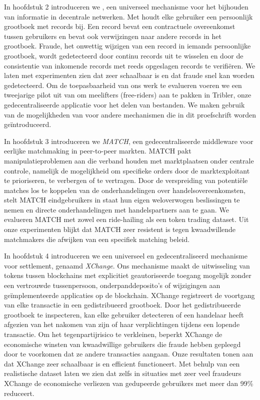{In hoofdstuk 2 introduceren we \emph{\TrustChain{}}, een universeel mechanisme voor het bijhouden van informatie in decentrale netwerken.
Met \TrustChain{} houdt elke gebruiker een persoonlijk grootboek met records bij.
Een record bevat een contractuele overeenkomst tussen gebruikers en bevat ook verwijzingen naar andere records in het grootboek.
Fraude, het onwettig wijzigen van een record in iemands persoonlijke grootboek, wordt gedetecteerd door continu records uit te wisselen en door de consistentie van inkomende records met reeds opgeslagen records te verifiëren.
We laten met experimenten zien dat \TrustChain{} zeer schaalbaar is en dat fraude snel kan worden gedetecteerd.
Om de toepasbaarheid van ons werk te evalueren voeren we een tweejarige pilot uit van \TrustChain{} om meelifters (free-riders) aan te pakken in Tribler, onze gedecentraliseerde applicatie voor het delen van bestanden.
We maken gebruik van de mogelijkheden van \TrustChain{} voor andere mechanismen die in dit proefschrift worden geïntroduceerd.

In hoofdstuk 3 introduceren we \emph{MATCH}, een gedecentraliseerde middleware voor eerlijke matchmaking in peer-to-peer markten.
MATCH pakt manipulatieproblemen aan die verband houden met marktplaatsen onder centrale controle, namelijk de mogelijkheid om specifieke orders door de marktexploitant te prioriseren, te verbergen of te vertragen.
Door de verspreiding van potentiële matches los te koppelen van de onderhandelingen over handelsovereenkomsten, stelt MATCH eindgebruikers in staat hun eigen weloverwogen beslissingen te nemen en directe onderhandelingen met handelspartners aan te gaan.
We evalueren MATCH met zowel een ride-hailing als een token trading dataset.
Uit onze experimenten blijkt dat MATCH zeer resistent is tegen kwaadwillende matchmakers die afwijken van een specifiek matching beleid.

In hoofdstuk 4 introduceren we een universeel en gedecentraliseerd mechanisme voor settlement, genaamd \emph{XChange}.
Ons mechanisme maakt de uitwisseling van tokens tussen blockchains met explicitiet geautoriseerde toegang mogelijk zonder een vertrouwde tussenpersoon, onderpanddeposito's of wijzigingen aan geïmplementeerde applicaties op de blockchain.
XChange registreert de voortgang van elke transactie in een gedistribueerd grootboek.
Door het gedistribueerde grootboek te inspecteren, kan elke gebruiker detecteren of een handelaar heeft afgezien van het nakomen van zijn of haar verplichtingen tijdens een lopende transactie.
Om het tegenpartijrisico te verkleinen, beperkt XChange de economische winsten van kwaadwillige gebruikers die fraude hebben gepleegd door te voorkomen dat ze andere transacties aangaan.
Onze resultaten tonen aan dat XChange zeer schaalbaar is en efficient functioneert.
Met behulp van een realistische dataset laten we zien dat zelfs in situaties met zeer veel fraudeurs XChange de economische verliezen van gedupeerde gebruikers met meer dan 99\% reduceert.

}
